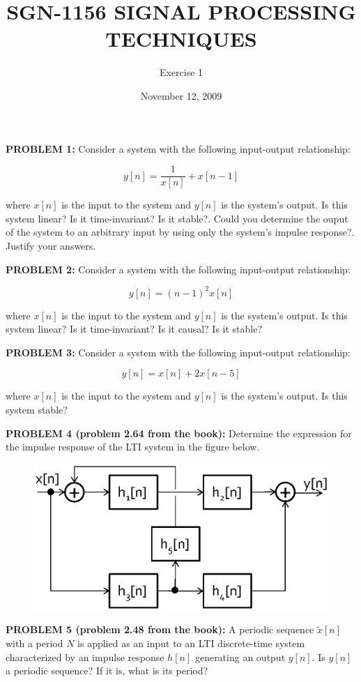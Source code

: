 \documentclass[11pt]{article}
\title{\large{\textbf{SGN-1156 SIGNAL PROCESSING TECHNIQUES}}}
\author{Exercise 1}
\date{November 12, 2009}
\begin{document}
\maketitle


\textbf{PROBLEM 1:}  Consider a system with the following input-output relationship:

\[
y[n] = \frac{1}{x[n]}+x[n-1]
\]

where $x[n]$ is the input to the system and $y[n]$ is the system's output. Is this system linear? Is it time-invariant? Is it stable?. Could you determine the ouput of the system to an arbitrary input by using only the system's impulse response?. Justify your answers. 

\vspace{1cm}



\textbf{PROBLEM 2:} Consider a system with the following input-output relationship:

\[
y[n] = (n-1)^2 x[n]
\]

where $x[n]$ is the input to the system and $y[n]$ is the system's output. Is this system linear? Is it time-invariant? Is it causal? Is it stable?

\vspace{1cm}




\textbf{PROBLEM 3:} Consider a system with the following input-output relationship:

\[
y[n] = x[n]+2x[n-5]
\]

where $x[n]$ is the input to the system and $y[n]$ is the system's output. Is this system stable?

\vspace{1cm}



\textbf{PROBLEM 4 (problem 2.64 from the book):}  Determine the expression for the impulse response of the LTI system in the figure below.


\begin{figure}[h!]
	\centering
		\includegraphics[width=.75\textwidth]{./system.eps}
\end{figure}



\vspace{1cm}

\textbf{PROBLEM 5 (problem 2.48 from the book):} A periodic sequence $\tilde{x}[n]$ with a period $N$ is applied as an input to an LTI discrete-time system characterized by an impulse response $h[n]$ generating an output $y[n]$. Is $y[n]$ a periodic sequence? If it is, what is its period?
\end{document}
